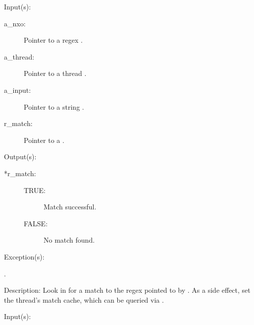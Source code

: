 \begin{capi}
\label{nxo_regex_match}
	\begin{capilist}
	\item[Input(s): ]
		\begin{description}\item[]
		\item[a\_nxo: ]
			Pointer to a regex .
		\item[a\_thread: ]
			Pointer to a thread .
		\item[a\_input: ]
			Pointer to a string .
		\item[r\_match: ]
			Pointer to a .
		\end{description}
	\item[Output(s): ]
		\begin{description}\item[]
		\item[*r\_match: ]
			\begin{description}\item[]
			\item[TRUE: ] Match successful.
			\item[FALSE: ] No match found.
			\end{description}
		\end{description}
	\item[Exception(s): ]
		\begin{description}\item[]
		\item[.]
		\end{description}
	\item[Description: ]
		Look in  for a match to the regex pointed to by
		.  As a side effect, set the thread's match cache,
		which can be queried via .
	\end{capilist}
\label{nxo_regex_nonew_match}
	\begin{capilist}
	\item[Input(s): ]

\end{capilist}
\end{capi}
